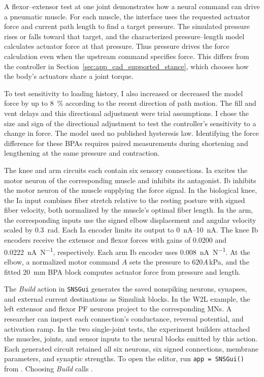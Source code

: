 A flexor--extensor test at one joint demonstrates how a neural command can drive a pneumatic muscle. For each muscle, the interface uses the requested actuator force and current path length to find a target pressure. The simulated pressure rises or falls toward that target, and the characterized pressure--length model calculates actuator force at that pressure. Thus pressure drives the force calculation even when the upstream command specifies force. This differs from the controller in Section~\ref{sec:app_cad_supported_stance}, which chooses how the body's actuators share a joint torque.

To test sensitivity to loading history, I also increased or decreased the model force by up to \qty{8}{\percent} according to the recent direction of path motion. The fill and vent delays and this directional adjustment were trial assumptions. I chose the size and sign of the directional adjustment to test the controller's sensitivity to a change in force. The model used no published hysteresis law. Identifying the force difference for these BPAs requires paired measurements during shortening and lengthening at the same pressure and contraction.

The knee and arm circuits each contain six sensory connections. Ia excites the motor neuron of the corresponding muscle and inhibits its antagonist. Ib inhibits the motor neuron of the muscle supplying the force signal. In the biological knee, the Ia input combines fiber stretch relative to the resting posture with signed fiber velocity, both normalized by the muscle's optimal fiber length. In the arm, the corresponding inputs use the signed elbow displacement and angular velocity scaled by \qty{0.3}{\radian}. Each Ia encoder limits its output to \qtyrange{0}{10}{\nano\ampere}. The knee Ib encoders receive the extensor and flexor forces with gains of 0.0200 and \qty{0.0222}{\nano\ampere\per\newton}, respectively. Each arm Ib encoder uses \qty{0.008}{\nano\ampere\per\newton}. At the elbow, a normalized motor command $A$ sets the pressure to $620A$\,kPa, and the fitted \qty{20}{\milli\meter} BPA block computes actuator force from pressure and length.

The \emph{Build} action in \texttt{SNSGui} generates the saved nonspiking neurons, synapses, and external current destinations as Simulink blocks. In the W2L example, the left extensor and flexor PF neurons project to the corresponding MNs. A researcher can inspect each connection's conductance, reversal potential, and activation ramp. In the two single-joint tests, the experiment builders attached the muscles, joints, and sensor inputs to the neural blocks emitted by this action. Each generated circuit retained all six neurons, six signed connections, membrane parameters, and synaptic strengths. To open the editor, run \verb|app = SNSGui()| from . Choosing \emph{Build} calls .

